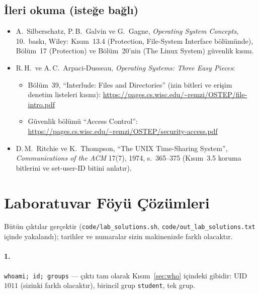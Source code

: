 \documentclass[11pt,a4paper]{article}
\newcommand{\cmd}[1]{\texttt{#1}}
\begin{document}
\subsection*{İleri okuma (isteğe bağlı)}
\begin{itemize}
  \item A.\ Silberschatz, P.\,B.\ Galvin ve G.\ Gagne, \emph{Operating System Concepts}, 10.\ baskı, Wiley: Kısım~13.4 (Protection, File-System Interface bölümünde), Bölüm~17 (Protection) ve Bölüm~20'nin (The Linux System) güvenlik kısmı.
  \item R.\,H.\ ve A.\,C.\ Arpaci-Dusseau, \emph{Operating Systems: Three Easy Pieces}:
  \begin{itemize}
    \item Bölüm~39, ``Interlude: Files and Directories'' (izin bitleri ve erişim denetim listeleri kısmı): \url{https://pages.cs.wisc.edu/~remzi/OSTEP/file-intro.pdf}
    \item Güvenlik bölümü ``Access Control'': \url{https://pages.cs.wisc.edu/~remzi/OSTEP/security-access.pdf}
  \end{itemize}
  \item D.\,M.\ Ritchie ve K.\ Thompson, ``The UNIX Time-Sharing System'', \emph{Communications of the ACM} 17(7), 1974, s.~365--375 (Kısım~3.5 koruma bitlerini ve set-user-ID bitini anlatır).
\end{itemize}

\section{Laboratuvar Föyü Çözümleri}
\label{sec:sol}

Bütün çıktılar gerçektir (\cmd{code/lab\_solutions.sh}, \cmd{code/out\_lab\_solutions.txt} içinde yakalandı); tarihler ve numaralar sizin makinenizde farklı olacaktır.

\paragraph{1.} \cmd{whoami; id; groups} --- çıktı tam olarak Kısım~\ref{sec:who} içindeki gibidir: UID $1011$ (sizinki farklı olacaktır), birincil grup \texttt{student}, tek grup.
\end{document}
